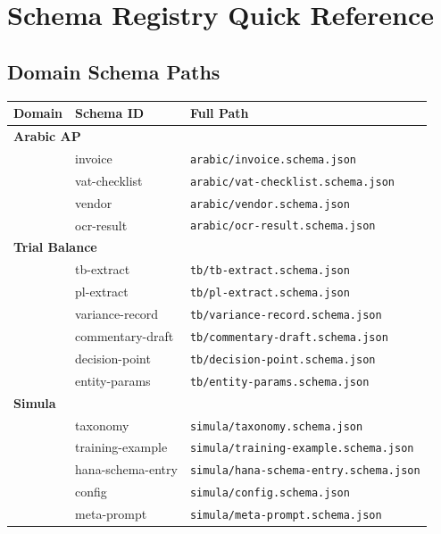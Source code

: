 \documentclass[11pt,a4paper]{report}
\newcommand{\schemapath}[1]{\texttt{\textcolor{pathcolor}{#1}}}
\begin{document}
\chapter{Schema Registry Quick Reference}

\section{Domain Schema Paths}

\begin{longtable}{@{}p{3cm}p{4cm}p{5cm}@{}}
\toprule
\textbf{Domain} & \textbf{Schema ID} & \textbf{Full Path} \\
\midrule
\endhead
\multicolumn{3}{l}{\textbf{Arabic AP}} \\
& invoice & \schemapath{arabic/invoice.schema.json} \\
& vat-checklist & \schemapath{arabic/vat-checklist.schema.json} \\
& vendor & \schemapath{arabic/vendor.schema.json} \\
& ocr-result & \schemapath{arabic/ocr-result.schema.json} \\
\midrule
\multicolumn{3}{l}{\textbf{Trial Balance}} \\
& tb-extract & \schemapath{tb/tb-extract.schema.json} \\
& pl-extract & \schemapath{tb/pl-extract.schema.json} \\
& variance-record & \schemapath{tb/variance-record.schema.json} \\
& commentary-draft & \schemapath{tb/commentary-draft.schema.json} \\
& decision-point & \schemapath{tb/decision-point.schema.json} \\
& entity-params & \schemapath{tb/entity-params.schema.json} \\
\midrule
\multicolumn{3}{l}{\textbf{Simula}} \\
& taxonomy & \schemapath{simula/taxonomy.schema.json} \\
& training-example & \schemapath{simula/training-example.schema.json} \\
& hana-schema-entry & \schemapath{simula/hana-schema-entry.schema.json} \\
& config & \schemapath{simula/config.schema.json} \\
& meta-prompt & \schemapath{simula/meta-prompt.schema.json} \\

\end{longtable}
\end{document}
